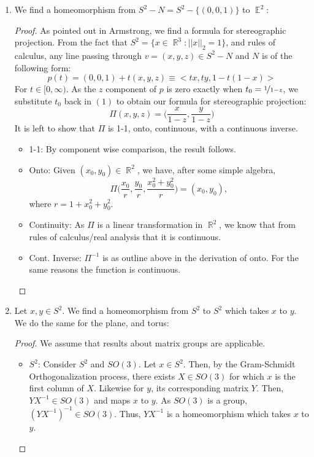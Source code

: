 \documentclass{book}
\DeclareMathOperator*{\R}{\mathbb{R}}
\DeclareMathOperator*{\E}{\mathbb{E}}
\begin{document}
\begin{enumerate}
    \item We find a homeomorphism from $S^2 - N = S^2 - \{(0,0,1)\}$ to $\E^2$: 
        \begin{proof} As pointed out in Armstrong, we find a formula for stereographic projection. From the fact that $S^2 = \{x \in \R^3: ||x||_2 =1\}$, and rules of calculus, any line passing through $v = (x,y,z) \in S^2 - N$ and $N$ is of the following form: 
            \begin{equation}
                p(t) = (0,0,1) + t(x,y,z) \equiv <tx,ty,1-t(1-x)>    
            \end{equation}
            For $t \in [0, \infty)$. As the $z$ component of $p$ is zero exactly when $t_0 = \nicefrac{1}{1-z}$, we substitute $t_0$ back in $(1)$ to obtain our formula for stereographic projection: 
            \[\Pi (x,y,z) = \big(\frac{x}{1-z},\frac{y}{1-z} \big) \]
            It is left to show that $\Pi$ is 1-1, onto, continuous, with a continuous inverse. 
            \begin{itemize}
                \item[] 1-1: By component wise comparison, the result follows. 
                \item[] Onto: Given $(x_0,y_0) \in \R^2$, we have, after some simple algebra, 
                    \[ \Pi \Big(\frac{x_0}{r}, \frac{y_0}{r}, \frac{x_0^2 + y_0^2}{r}\Big) = (x_0,y_0),\]
                    where $r = 1+x_0^2 +y_0^2$.  
                \item[] Continuity: As $\Pi$ is a linear transformation in $\R^2$, we know that from rules of calculus/real analysis that it is continuous.
                \item[] Cont. Inverse: $\Pi^{-1}$ is as outline above in the derivation of onto. For the same reasons the function is continuous. 
            \end{itemize}
        \end{proof}

    \item Let $x,y \in S^2$. We find a homeomorphism from $S^2$ to $S^2$ which takes $x$ to $y$. We do the same for the plane, and torus: 
        \begin{proof} We assume that results about matrix groups are applicable. 
            \begin{itemize}
                \item $S^2$: Consider $S^2$ and $SO(3)$. Let $x \in S^2$. Then, by the Gram-Schmidt Orthogonalization process, there exists $X \in SO(3)$ for which $x$ is the first column of $X$. Likewise for $y$, its corresponding matrix $Y$. Then, $YX^{-1} \in SO(3)$ and maps $x$ to $y$. As $SO(3)$ is a group, $(YX^{-1})^{-1} \in SO(3)$. Thus, $YX^{-1}$ is a homeomorphism which takes $x$ to $y$.


\end{itemize}
\end{proof}
\end{enumerate}
\end{document}
